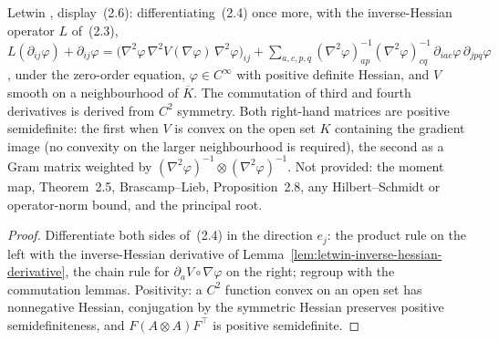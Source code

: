 \begin{lemma}
  \label{lem:letwin-monge-ampere-second}
  \leanok
  Letwin \cite{Letwin2026QuadraticKLS}, display~(2.6): differentiating~(2.4) once more, with the
  inverse-Hessian operator $L$ of~(2.3),
  $L(\partial_{ij}\varphi)+\partial_{ij}\varphi=\big(\nabla^2\varphi\,\nabla^2V(\nabla\varphi)\,\nabla^2\varphi\big)_{ij}
  +\sum_{a,c,p,q}(\nabla^2\varphi)^{-1}_{ap}(\nabla^2\varphi)^{-1}_{cq}\,\partial_{iac}\varphi\,\partial_{jpq}\varphi$,
  under the zero-order equation, $\varphi\in C^\infty$ with positive definite Hessian, and $V$ smooth on a
  neighbourhood of $\overline K$.  The commutation of third and fourth derivatives is derived from $C^2$
  symmetry.  Both right-hand matrices are positive semidefinite: the first when $V$ is convex on the open
  set $K$ containing the gradient image (no convexity on the larger neighbourhood is required), the second
  as a Gram matrix weighted by $(\nabla^2\varphi)^{-1}\otimes(\nabla^2\varphi)^{-1}$.  Not provided: the
  moment map, Theorem~2.5, Brascamp--Lieb, Proposition~2.8, any Hilbert--Schmidt or operator-norm bound,
  and the principal root.
\end{lemma}
\begin{proof}
  \leanok
  Differentiate both sides of~(2.4) in the direction $e_j$: the product rule on the left with the
  inverse-Hessian derivative of Lemma~\ref{lem:letwin-inverse-hessian-derivative}, the chain rule for
  $\partial_aV\circ\nabla\varphi$ on the right; regroup with the commutation lemmas.  Positivity: a $C^2$
  function convex on an open set has nonnegative Hessian, conjugation by the symmetric Hessian preserves
  positive semidefiniteness, and $F(A\otimes A)F^{\!\top}$ is positive semidefinite.
\end{proof}


